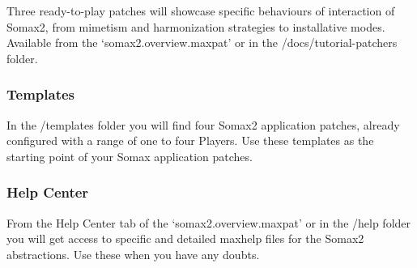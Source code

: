 Three ready-to-play patches will showcase specific behaviours of interaction of Somax2, from mimetism and harmonization strategies to installative modes. Available from the `somax2.overview.maxpat' or in the /docs/tutorial-patchers folder.

\subsubsection{Templates}

In the /templates folder you will find four Somax2 application patches, already configured with a range of one to four Players.
Use these templates as the starting point of your Somax application patches.

\subsubsection{Help Center}

From the Help Center tab of the `somax2.overview.maxpat' or in the /help folder you will get access to specific and detailed maxhelp files for the Somax2 abstractions. Use these when you have any doubts. 

